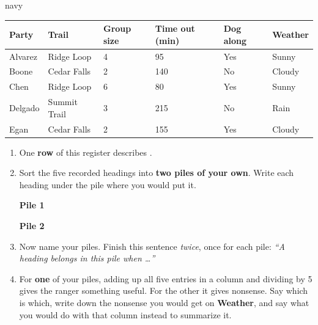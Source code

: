 \vspace{0.04in}

\begin{scenariobox}{navy}
\small
\renewcommand{\arraystretch}{1.12}
\begin{tabularx}{\linewidth}{@{} l Y Y Y Y Y @{}}
\textbf{Party} & \textbf{Trail} & \textbf{Group size} & \textbf{Time out (min)} &
\textbf{Dog along} & \textbf{Weather} \\
\hline
Alvarez  & Ridge Loop   & 4 &  95 & Yes & Sunny  \\
Boone    & Cedar Falls  & 2 & 140 & No  & Cloudy \\
Chen     & Ridge Loop   & 6 &  80 & Yes & Sunny  \\
Delgado  & Summit Trail & 3 & 215 & No  & Rain   \\
Egan     & Cedar Falls  & 2 & 155 & Yes & Cloudy \\
\hline
\end{tabularx}

\normalsize
\begin{enumerate}[label=\textbf{\alph*.}, leftmargin=1.8em, itemsep=6pt]
  \item One \textbf{row} of this register describes \blank{4.6cm}.
  \item Sort the five recorded headings into \textbf{two piles of your own}. Write each
        heading under the pile where you would put it.

        \begin{minipage}[t]{0.47\linewidth}
        \textbf{Pile 1}
        \answerspace{1.4cm}{}
        \end{minipage}\hfill
        \begin{minipage}[t]{0.47\linewidth}
        \textbf{Pile 2}
        \answerspace{1.4cm}{}
        \end{minipage}
  \item Now name your piles. Finish this sentence \emph{twice}, once for each pile:
        \emph{``A heading belongs in this pile when \ldots{}''}
        \answerspace{2.0cm}{}
  \item For \textbf{one} of your piles, adding up all five entries in a column and dividing by 5
        gives the ranger something useful. For the other it gives nonsense. Say which is which,
        write down the nonsense you would get on \textbf{Weather}, and say what you would do
        with that column instead to summarize it.
        \answerspace{2.4cm}{}
\end{enumerate}
\end{scenariobox}

